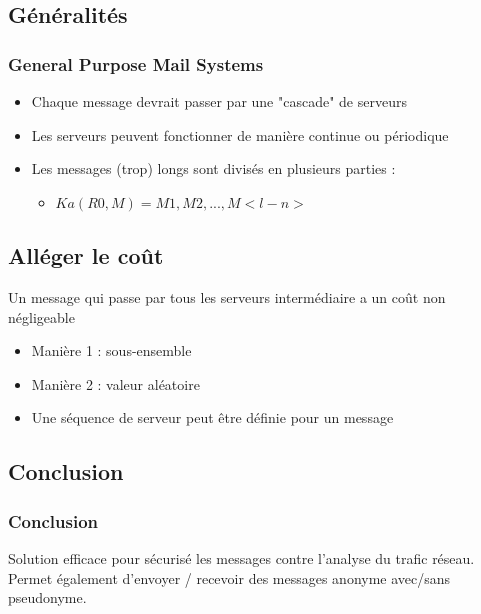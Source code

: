 \documentclass{beamer}
\begin{document}
\subsection{Généralités}
\begin{frame}
\frametitle{General Purpose Mail Systems}
\begin{itemize}
[triangle]
\item Chaque message devrait passer par une "cascade" de serveurs
\item Les serveurs peuvent fonctionner de manière continue ou périodique
\item Les messages (trop) longs sont divisés en plusieurs parties :
	\begin{itemize}
		\item $Ka( R0, M ) = M1, M2, ..., M<l-n>$
	\end{itemize}
\end{itemize}
\end{frame}

\subsection{Alléger le coût}
\begin{frame}
Un message qui passe par tous les serveurs intermédiaire a un coût non négligeable
\begin{itemize}
[triangle]
\item Manière 1 : sous-ensemble
\item Manière 2 : valeur aléatoire
\item Une séquence de serveur peut être définie pour un message
\end{itemize}
\end{frame}


\subsection{Conclusion}
\begin{frame}
\frametitle{Conclusion}
Solution efficace pour sécurisé les messages contre l'analyse du trafic réseau.\\
Permet également d'envoyer / recevoir des messages anonyme avec/sans pseudonyme.
\end{frame}
\end{document}
